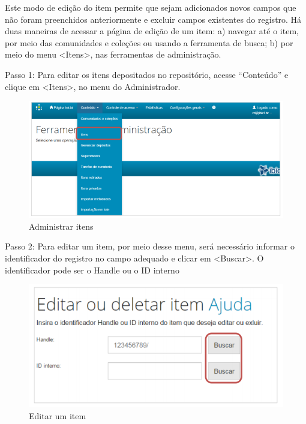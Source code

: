 \documentclass[12pt,hidelinks]{article}
\begin{document}
    Este modo de edição do item permite que sejam adicionados novos campos que não foram preenchidos anteriormente e excluir campos existentes do registro. Há duas maneiras de acessar a página de edição de um item: a) navegar até o item, por meio das comunidades e coleções ou usando a ferramenta de busca; b) por meio do menu <Itens>, nas ferramentas de administração.
    
    \singlespacing
    
    Passo 1: Para editar os itens depositados no repositório, acesse “Conteúdo” e clique em <Itens>, no menu do Administrador. 
    
    \begin{figure}[!htp]
                \centering
                \includegraphics[scale=0.8]{figura/Figura85.png}
                \caption{Administrar itens}
            \label{Rotulo}
        \end{figure}
    
    Passo 2: Para editar um item, por meio desse menu, será necessário informar o identificador do registro no campo adequado e clicar em <Buscar>. O identificador pode ser o Handle ou o ID interno
    
    \begin{figure}[!htp]
                \centering
                \includegraphics[scale=0.8]{figura/Figura86.png}
                \caption{Editar um item}
            \label{Rotulo}
        \end{figure}
    
\end{document}
